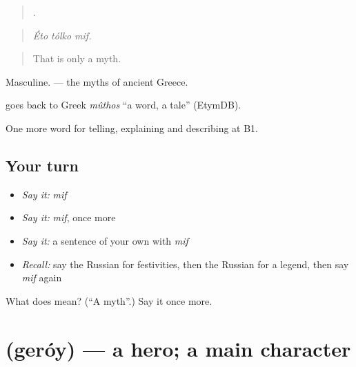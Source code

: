 \begin{quote}
  .
\end{quote}

\begin{quote}
\emph{Éto tólko mif.}
\end{quote}

\begin{quote}
That is only a myth.
\end{quote}

Masculine. \emph{  } — the myths of ancient Greece.

\begin{cousinweb}
\emph{} goes back to Greek \emph{mûthos} \textquotedblleft{}a word, a tale\textquotedblright{} (EtymDB).
\end{cousinweb}

\begin{grammarlens}[title={What you've built}]
One more word for telling, explaining and describing at B1.
\end{grammarlens}

\subsection*{Your turn}
\begin{itemize}
\raggedright
  \item \emph{Say it:} \emph{mif}
  \item \emph{Say it:} \emph{mif}, once more
  \item \emph{Say it:} a sentence of your own with \emph{mif}
  \item \emph{Recall:} say the Russian for festivities, then the Russian for a legend, then say \emph{mif} again
\end{itemize}

\begin{tcolorbox}[breakable,colback=teal!4,colframe=teal!35!black,title={Before you move on}]
What does  mean? (\textquotedblleft{}A myth\textquotedblright{}.) Say it once more.
\end{tcolorbox}
\section[\texorpdfstring{\ru{герой} (geróy)}{герой (geróy)}]{ (geróy) — a hero; a main character}

\label{lesson:RU-C319-geroy}



